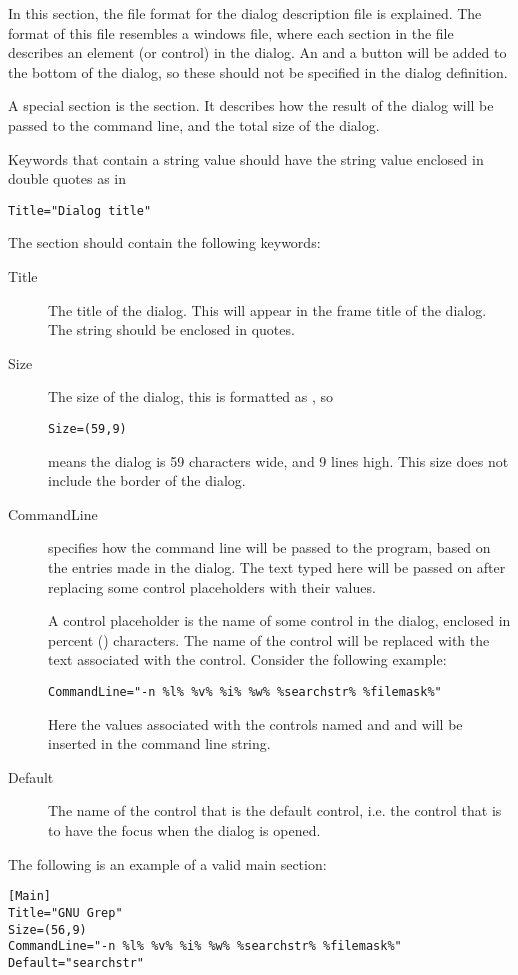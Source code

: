 In this section, the file format for the dialog description file is explained.
The format of this file resembles a windows  file, where each section
in the file describes an element (or control) in the dialog.
An  and a  button will be added to the bottom of the dialog,
so these should not be specified in the dialog definition.

A special section is the  section. It describes how the result of
the dialog will be passed to the command line, and the total size of the dialog.

\begin{remark}
Keywords that contain a string value should have the string value enclosed
in double quotes as in
\begin{verbatim}
Title="Dialog title"
\end{verbatim}
\end{remark}

The  section should contain the following keywords:
\begin{description}
\item[Title] The title of the dialog. This will appear in the frame title of the dialog.
The string should be enclosed in quotes.
\item[Size] The size of the dialog, this is formatted as , so
\begin{verbatim}
Size=(59,9)
\end{verbatim}
means the dialog is 59 characters wide, and 9 lines high. This size does not include
the border of the dialog.
\item[CommandLine] specifies how the command line will be passed to the
program, based on the entries made in the dialog. The text typed here will be passed
on after replacing some control placeholders with their values.

A control placeholder is the name of some control in the dialog, enclosed in
percent (\var{\%}) characters. The name of the control will be replaced with
the text associated with the control. Consider the following example:
\begin{verbatim}
CommandLine="-n %l% %v% %i% %w% %searchstr% %filemask%"
\end{verbatim}
Here the values associated with the controls named  and
 and  will be inserted in the command line
string.
\item[Default]
The name of the control that is the default control, i.e. the control
that is to have the focus when the dialog is opened.
\end{description}
The following is an example of a valid main section:
\begin{verbatim}
[Main]
Title="GNU Grep"
Size=(56,9)
CommandLine="-n %l% %v% %i% %w% %searchstr% %filemask%"
Default="searchstr"
\end{verbatim}

